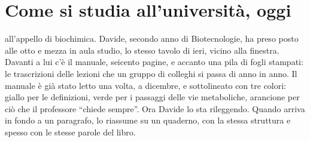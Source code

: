 %
\chapter{Come si studia all'università, oggi}
\label{cap:oggi}


 all'appello di biochimica. Davide,
secondo anno di Biotecnologie, ha preso posto alle otto e mezza in
aula studio, lo stesso tavolo di ieri, vicino alla finestra. Davanti a
lui c'è il manuale, seicento pagine, e accanto una pila di fogli
stampati: le trascrizioni delle lezioni che un gruppo di colleghi si
passa di anno in anno. Il manuale è già stato letto una volta, a
dicembre, e sottolineato con tre colori: giallo per le definizioni,
verde per i passaggi delle vie metaboliche, arancione per ciò che il
professore \enquote{chiede sempre}. Ora Davide lo sta rileggendo.
Quando arriva in fondo a un paragrafo, lo riassume su un quaderno, con
la stessa struttura e spesso con le stesse parole del libro.

